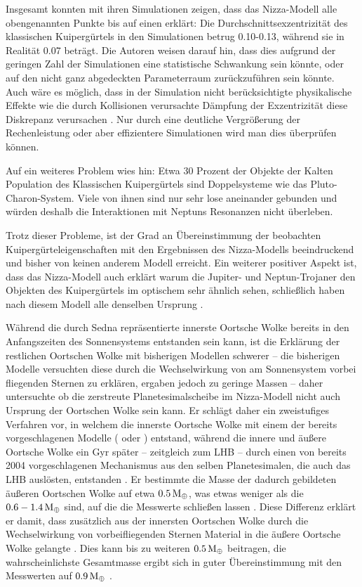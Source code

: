 \documentclass[12pt,a4paper,twoside,open=right,bibliography=totoc]{scrbook}
\renewcommand{\cite}{ \citep}
\newcommand{\ME}{M_\oplus}
\begin{document}
Insgesamt konnten \cite{Levison2008}mit ihren Simulationen zeigen, dass das Nizza-Modell alle obengenannten Punkte bis auf einen erklärt: Die Durchschnittsexzentrizität des klassischen Kuipergürtels in den Simulationen betrug 0.10-0.13, während sie in Realität 0.07 beträgt.
Die Autoren weisen darauf hin, dass dies aufgrund der geringen Zahl der Simulationen eine statistische Schwankung sein könnte, oder auf den nicht ganz abgedeckten Parameterraum zurückzuführen sein könnte. Auch wäre es möglich, dass in der Simulation nicht berücksichtigte physikalische Effekte wie die durch Kollisionen verursachte Dämpfung der Exzentrizität diese Diskrepanz verursachen\cite{Levison2008}.
Nur durch eine deutliche Vergrößerung der Rechenleistung oder aber effizientere Simulationen wird man dies überprüfen können.

Auf ein weiteres Problem wies \cite{Parker2010} hin:
Etwa 30 Prozent der Objekte der Kalten Population des Klassischen Kuipergürtels sind Doppelsysteme wie das Pluto-Charon-System.
Viele von ihnen sind nur sehr lose aneinander gebunden und würden deshalb die Interaktionen mit Neptuns Resonanzen nicht überleben.

Trotz dieser Probleme, ist der Grad an Übereinstimmung der beobachten Kuiper\-gürtel\-eigen\-schaften mit den Ergebnissen des Nizza-Modells beeindruckend und bisher von keinen anderem Modell erreicht.
Ein weiterer positiver Aspekt ist, dass das Nizza-Modell auch erklärt warum die Jupiter- und Neptun-Trojaner den Objekten des Kuipergürtels im optischem sehr ähnlich sehen, schließlich haben nach diesem Modell alle denselben Ursprung\cite{Morbidelli2005}.

Während die durch Sedna repräsentierte innerste Oortsche Wolke bereits in den Anfangszeiten des Sonnensystems entstanden sein kann, ist die Erklärung der restlichen Oortschen Wolke mit bisherigen Modellen schwerer – die bisherigen Modelle versuchten diese durch die Wechselwirkung von am Sonnensystem vorbei fliegenden Sternen zu erklären, ergaben jedoch zu geringe Massen – daher untersuchte \cite{Brasser2008} ob die zerstreute Planetesimalscheibe im Nizza-Modell nicht auch Ursprung der Oortschen Wolke sein kann.
Er schlägt daher ein zweistufiges Verfahren vor, in welchem die innerste Oortsche Wolke mit einem der bereits vorgeschlagenen Modelle (\cite{Brasser2006,Brasser2007} oder \cite{Kaib2008}) entstand, während die innere und äußere Oortsche Wolke ein Gyr später – zeitgleich zum LHB – durch einen von \cite{Dones2004} bereits 2004 vorgeschlagenen Mechanismus aus den selben Planetesimalen, die auch das LHB auslösten, entstanden\cite{Brasser2008}.
Er bestimmte die Masse der dadurch gebildeten äußeren Oortschen Wolke auf etwa $\unit[0.5]{\ME}$, was etwas weniger als die $\unit[0.6-1.4]{\ME}$ sind, auf die die Messwerte schließen lassen\cite{Brasser2008}. Diese Differenz erklärt er damit, dass zusätzlich aus der innersten Oortschen Wolke durch die Wechselwirkung von vorbeifliegenden Sternen Material in die äußere Oortsche Wolke gelangte\cite{Brasser2008}.
Dies kann bis zu weiteren $\unit[0.5]{\ME}$ beitragen, die wahrscheinlichste Gesamtmasse ergibt sich in guter Übereinstimmung mit den Messwerten auf $\unit[0.9]{\ME}$\cite{Brasser2008}.
\end{document}
